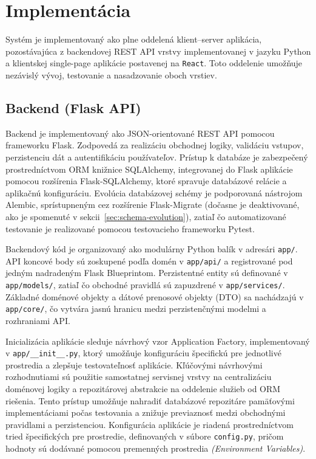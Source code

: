
\section{Implementácia}

Systém je implementovaný ako plne oddelená klient--server aplikácia, pozostávajúca z backendovej REST API vrstvy implementovanej v jazyku Python a klientskej single-page aplikácie postavenej na \texttt{React}. Toto oddelenie umožňuje nezávislý vývoj, testovanie a nasadzovanie oboch vrstiev.


\subsection{Backend (Flask API)} 

Backend je implementovaný ako JSON-orientované REST API pomocou frameworku Flask. Zodpovedá za realizáciu obchodnej logiky, validáciu vstupov, perzistenciu dát a autentifikáciu používateľov. Prístup k databáze je zabezpečený prostredníctvom ORM knižnice SQLAlchemy, integrovanej do Flask aplikácie pomocou rozšírenia Flask-SQLAlchemy, ktoré spravuje databázové relácie a aplikačnú konfiguráciu. Evolúcia databázovej schémy je podporovaná nástrojom Alembic, sprístupneným cez rozšírenie Flask-Migrate (dočasne je deaktivované, ako je spomenuté v sekcii~\ref{sec:schema-evolution}), zatiaľ čo automatizované testovanie je realizované pomocou testovacieho frameworku Pytest.

Backendový kód je organizovaný ako modulárny Python balík v adresári \texttt{app/}. API koncové body sú zoskupené podľa domén v \texttt{app/api/} a registrované pod jedným nadradeným Flask Blueprintom. Perzistentné entity sú definované v \texttt{app/models/}, zatiaľ čo obchodné pravidlá sú zapuzdrené v \texttt{app/services/}. Základné doménové objekty a dátové prenosové objekty (DTO) sa nachádzajú v \texttt{app/core/}, čo vytvára jasnú hranicu medzi perzistenčnými modelmi a rozhraniami API.

Inicializácia aplikácie sleduje návrhový vzor Application Factory, implementovaný v \texttt{app/\_\_init\_\_.py}, ktorý umožňuje konfiguráciu špecifickú pre jednotlivé prostredia a zlepšuje testovateľnosť aplikácie. Kľúčovými návrhovými rozhodnutiami sú použitie samostatnej servisnej vrstvy na centralizáciu doménovej logiky a repozitárovej abstrakcie na oddelenie služieb od ORM riešenia. Tento prístup umožňuje nahradiť databázové repozitáre pamäťovými implementáciami počas testovania a znižuje previaznosť medzi obchodnými pravidlami a perzistenciou. Konfigurácia aplikácie je riadená prostredníctvom tried špecifických pre prostredie, definovaných v súbore \texttt{config.py}, pričom hodnoty sú dodávané pomocou premenných prostredia \textit{(Environment Variables)}.


